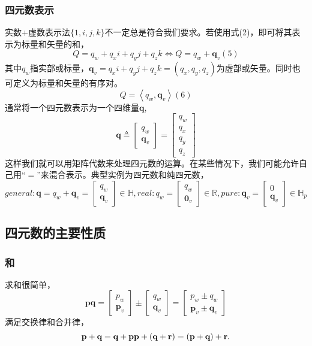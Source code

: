 \documentclass{article}
\begin{document}
\subsubsection{四元数表示}
实数+虚数表示法$\{1,i,j,k\}$不一定总是符合我们要求。若使用式(2)，即可将其表示为标量和矢量的和，
$$
    Q=q_w+q_xi+q_yj+q_zk \Leftrightarrow  Q=q_w+\textbf{q}_v  (5)
$$其中$q_w$指实部或标量，$\textbf{q}_v = q_xi+q_yj+q_zk=(q_x,q_y,q_z)$为虚部或矢量。同时也可定义为标量和矢量的有序对。
$$
    Q=\left \langle q_w,\textbf{q}_v \right \rangle (6)
$$
通常将一个四元数表示为一个四维量$\textbf{q}$,
$$
\textbf{q} \triangleq \begin{bmatrix}q_w\\\textbf{q}_v 
\end{bmatrix} = 
\begin{bmatrix}q_w \\ q_x \\ q_y\\ q_z
\end{bmatrix} 
$$这样我们就可以用矩阵代数来处理四元数的运算。在某些情况下，我们可能允许自己用“$=$”来混合表示。典型实例为四元数和纯四元数，
$$
general: \textbf{q} = q_w+\textbf{q}_v = \begin{bmatrix}q_w\\\textbf{q}_v 
\end{bmatrix} \in \mathbb{H},
real: q_w = \begin{bmatrix}q_w\\\textbf{0}_v 
\end{bmatrix} \in \mathbb{R},
pure: \textbf{q}_v = \begin{bmatrix}0\\\textbf{q}_v 
\end{bmatrix} \in \mathbb{H}_p$$
\subsection{四元数的主要性质}
\subsubsection{和}
求和很简单，
$$
\textbf{p} \textbf{q} = \begin{bmatrix}p_w\\\textbf{p}_v 
\end{bmatrix} \pm \begin{bmatrix}q_w\\\textbf{q}_v 
\end{bmatrix} = \begin{bmatrix}p_w \pm q_w\\\textbf{p}_v \pm \textbf{q}_v 
\end{bmatrix}
$$满足交换律和合并律，
$$
\textbf{p}+\textbf{q} = \textbf{q} + \textbf{p}
\\
\textbf{p} + (\textbf{q}+\textbf{r}) = (\textbf{p}+\textbf{q})+ \textbf{r}.
$$
\end{document}
